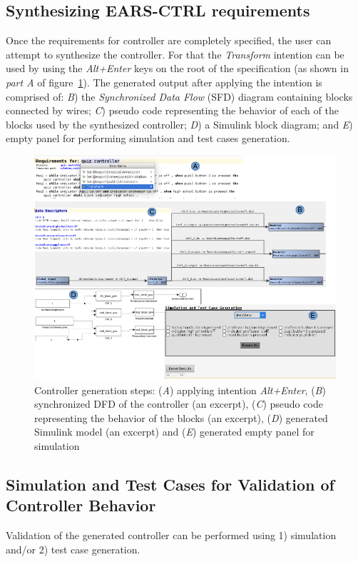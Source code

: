 \subsection{Synthesizing \textsf{EARS-CTRL} requirements}
\label{SynthReq}
\vspace{-.3cm}
Once the requirements for controller are completely specified, the user can
attempt to synthesize the controller. For that the \emph{Transform} intention
can be used by using the \emph{Alt+Enter} keys on the root of the specification
(as shown in \emph{part A} of figure~\ref{fig:Spec_transform}). The generated
output after applying the intention is comprised of: \emph{B}) the 
\emph{Synchronized Data Flow} (SFD) diagram containing blocks connected by
wires; \emph{C}) pseudo code representing the behavior of each of the blocks
used by the synthesized controller; \emph{D}) a Simulink block
diagram; and \emph{E}) empty panel
for performing simulation and test cases generation.
\begin{figure}[!h]
\centering
\includegraphics[width=1\textwidth]{./images/Transform.png}
\caption{Controller generation steps: (\emph{A}) applying intention \emph{Alt+Enter},
(\emph{B}) synchronized DFD of the controller (an excerpt), (\emph{C}) pseudo
code representing the behavior of the blocks (an excerpt), (\emph{D})
generated Simulink model (an excerpt) and (\emph{E})
generated empty panel for simulation}
\label{fig:Spec_transform}
\end{figure}
\subsection{Simulation and Test Cases for Validation of Controller
Behavior}
\vspace{-.2cm}
Validation of the generated controller can be performed using 1) simulation
and/or 2) test case generation.
\vspace{-.3cm}
